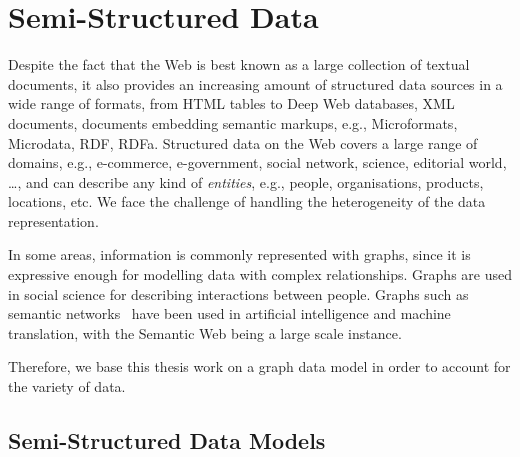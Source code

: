 \chapter{Semi-Structured Data}
\label{chap2:semi-structured-data}

Despite the fact that the Web is best known as a large collection of textual documents, it also provides an increasing amount of structured data sources in a wide range of formats, from HTML tables to Deep Web databases, XML documents, documents embedding semantic markups, e.g., Microformats, Microdata, RDF, RDFa. Structured data on the Web covers a large range of domains, e.g., e-commerce, e-government, social network, science, editorial world, \ldots, and can describe any kind of \emph{entities}, e.g., people, organisations, products, locations, etc. We face the challenge of handling the heterogeneity of the data representation.

In some areas, information is commonly represented with graphs, since it is expressive enough for modelling data with complex relationships. Graphs are used in social science for describing interactions between people. Graphs such as semantic networks~\cite{sowa2006semantic} have been used in artificial intelligence and machine translation, with the Semantic Web being a large scale instance.

Therefore, we base this thesis work on a graph data model in order to account for the variety of data.

%

\section{Semi-Structured Data Models}

